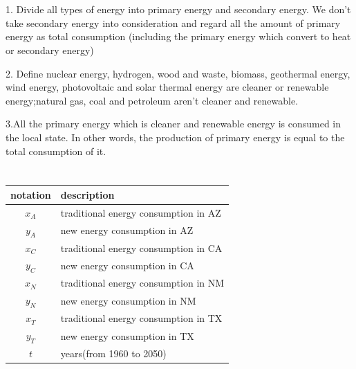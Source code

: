 \documentclass[12pt]{article}
\begin{document}
\section{}

1. Divide all types of energy into primary energy and secondary energy. We don't take secondary energy into consideration and regard all the amount of primary energy as total consumption (including the primary energy which convert to heat or secondary energy)

2. Define nuclear energy, hydrogen, wood and waste, biomass, geothermal energy, wind energy, photovoltaic and solar thermal energy are cleaner or renewable energy;natural gas, coal and petroleum aren't cleaner and renewable.

3.All the primary energy which is cleaner and renewable energy is consumed in the
local state. In other words, the production of primary energy is equal to the total consumption
of it.

\section{}
\newpage
\begin{table}[!h]\centering\small
\begin{tabular}{|c|l| }
\hline
 notation&description\\
 \hline
$x_{A}$&traditional energy consumption in AZ\\
\hline
$y_{A}$&new energy consumption in AZ\\
\hline
$x_{C}$&traditional energy consumption in CA\\
\hline
$y_{C}$&new energy consumption in CA\\
\hline
$x_{N}$&traditional energy consumption in NM\\
\hline
$y_{N}$&new energy consumption in NM\\
\hline
$x_{T}$&traditional energy consumption in TX\\
\hline
$y_{T}$&new energy consumption in TX\\
\hline
$t$&years(from 1960 to 2050)\\
\hline
\end{tabular}
\end{table}


\section{\leftline{Part \uppercase\expandafter{\romannumeral1}}}
\end{document}

